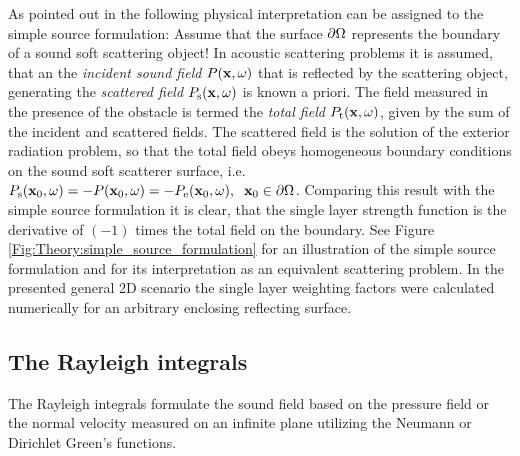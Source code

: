 \vspace{3mm}
As pointed out in \cite{Fazi2013:Equivalent_scattering, Fazi2010, Schultz2014:Comparing_approaches, Zotter2013:uniqueness} the following physical interpretation can be assigned to the simple source formulation: 
Assume that the surface $\partial \Omega$ represents the boundary of a sound soft scattering object!
In acoustic scattering problems it is assumed, that an the \emph{incident sound field} $P(\mathbf{x},\omega)$ that is reflected by the scattering object, generating the \emph{scattered field} $P_{\mathrm{s}}(\mathbf{x},\omega)$ is known a priori.
The field measured in the presence of the obstacle is termed the \emph{total field} $P_{\mathrm{t}}(\mathbf{x},\omega)$, given by the sum of the incident and scattered fields.
The scattered field is the solution of the exterior radiation problem, so that the total field obeys homogeneous boundary conditions on the sound soft scatterer surface, i.e. $P_{\mathrm{s}}(\mathbf{x}_0,\omega) = -P(\mathbf{x}_0,\omega) = - P_{\mathrm{e}}(\mathbf{x}_0,\omega), \hspace{.2cm} \mathbf{x}_0 \in \partial \Omega$.
Comparing this result with the simple source formulation it is clear, that the single layer strength function is the derivative of $(-1)$ times the total field on the boundary.
See Figure \ref{Fig:Theory:simple_source_formulation} for an illustration of the simple source formulation and for its interpretation as an equivalent scattering problem.
In the presented general 2D scenario the single layer weighting factors were calculated numerically for an arbitrary enclosing reflecting surface.

\subsection{The Rayleigh integrals}
\label{Section:Theory:Rayleigh}

The Rayleigh integrals formulate the sound field based on the pressure field or the normal velocity measured on an infinite plane utilizing the Neumann or Dirichlet Green's functions.

